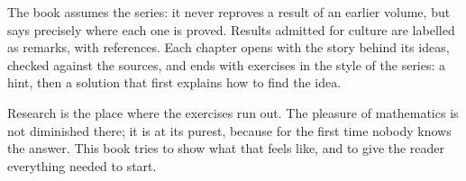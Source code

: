 The book assumes the series: it never reproves a result of an earlier volume, but says precisely where each one is proved.
Results admitted for culture are labelled as remarks, with references. Each chapter opens with the story behind its
ideas, checked against the sources, and ends with exercises in the style of the series: a hint, then a solution that first
explains how to find the idea.

Research is the place where the exercises run out. The pleasure of mathematics is not diminished there; it is at its
purest, because for the first time nobody knows the answer. This book tries to show what that feels like, and to give
the reader everything needed to start.
